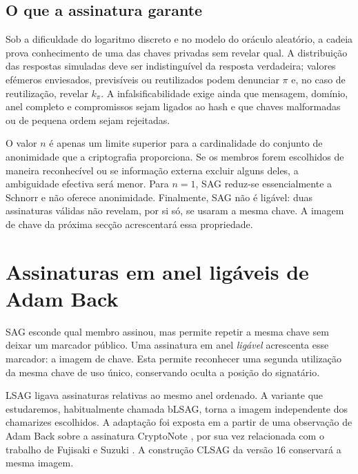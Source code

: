 

\subsection*{O que a assinatura garante}

Sob a dificuldade do logaritmo discreto e no modelo do oráculo aleatório, a
cadeia prova conhecimento de uma das chaves privadas sem revelar qual. A
distribuição das respostas simuladas deve ser indistinguível da resposta
verdadeira; valores efémeros enviesados, previsíveis ou reutilizados podem
denunciar \(\pi\) e, no caso de reutilização, revelar \(k_\pi\). A
infalsificabilidade exige ainda que mensagem, domínio, anel completo e
compromissos sejam ligados ao hash e que chaves malformadas ou de pequena
ordem sejam rejeitadas.

O valor \(n\) é apenas um limite superior para a cardinalidade do conjunto de
anonimidade que a criptografia proporciona. Se os membros forem escolhidos de
maneira reconhecível ou se informação externa excluir alguns deles, a
ambiguidade efectiva será menor. Para \(n=1\), SAG
reduz-se essencialmente a Schnorr e não oferece anonimidade. Finalmente, SAG
não é ligável: duas assinaturas válidas não revelam, por si só, se usaram a
mesma chave. A imagem de chave da próxima secção acrescentará essa
propriedade.

\section{Assinaturas em anel ligáveis de Adam Back}
\label{blsag_note}

SAG esconde qual membro assinou, mas permite repetir a mesma chave sem deixar
um marcador público. Uma assinatura em anel \emph{ligável} acrescenta esse
marcador: a imagem de chave. Esta permite reconhecer uma segunda utilização
da mesma chave de uso único, conservando oculta a posição do signatário.

LSAG \cite{Liu2004} ligava assinaturas relativas ao mesmo anel ordenado. A
variante que estudaremos, habitualmente chamada bLSAG, torna a imagem
independente dos chamarizes escolhidos. A adaptação foi exposta em
\cite{MRL-0005-ringct} a partir de uma observação de Adam Back
\cite{AdamBack-ring-efficiency} sobre a assinatura CryptoNote
\cite{cryptoNoteWhitePaper}, por sua vez relacionada com o trabalho de
Fujisaki e Suzuki \cite{Fujisaki2007}. A construção CLSAG da versão 16 conservará a mesma imagem.

